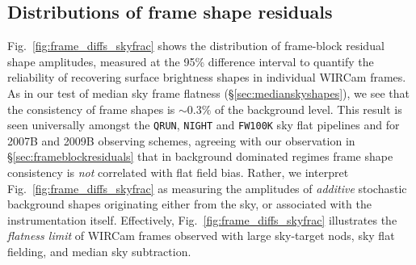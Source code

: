 \documentclass[iop,tighten]{emulateapj}
\newcommand{\Fig}[1]{Fig.~\ref{fig:#1}}  %
\newcommand{\Sec}[1]{\S\ref{sec:#1}}  %
\begin{document}

\subsection{Distributions of frame shape residuals}
\label{sec:frameblockresidualhist}

\Fig{frame_diffs_skyfrac} shows the distribution of frame-block residual shape amplitudes, measured at the 95\% difference interval to quantify the reliability of recovering surface brightness shapes in individual WIRCam frames.
As in our test of median sky frame flatness (\Sec{medianskyshapes}), we see that the consistency of frame shapes is $\sim 0.3\%$ of the background level.
This result is seen universally amongst the \texttt{QRUN}, \texttt{NIGHT}  and \texttt{FW100K} sky flat pipelines and for 2007B and 2009B observing schemes, agreeing with our observation in \Sec{frameblockresiduals} that in background dominated regimes frame shape consistency is \emph{not} correlated with flat field bias.
Rather, we interpret \Fig{frame_diffs_skyfrac} as measuring the amplitudes of \emph{additive} stochastic background shapes originating either from the sky, or associated with the instrumentation itself.
Effectively, \Fig{frame_diffs_skyfrac} illustrates the \emph{flatness limit} of WIRCam frames observed with large sky-target nods, sky flat fielding, and median sky subtraction.
\end{document}
